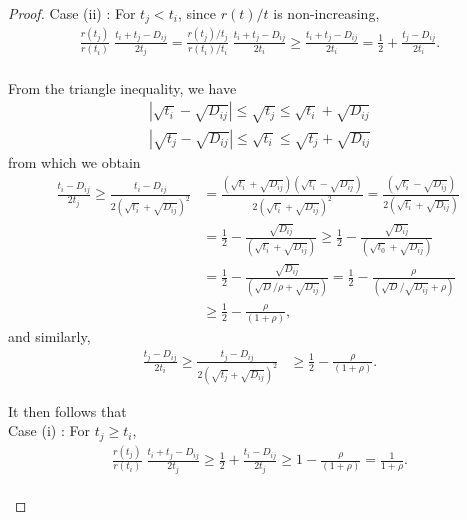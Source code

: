 \documentclass[11pt]{article}
\theoremstyle{definition}
\begin{document}
\begin{proof}
  {Case (ii) \hspace{-1mm}:} For $t_j < t_i$, since $r(t)/t$ is non-increasing,
  \begin{align}
   \nonumber   \frac{r(t_j)}{r(t_i)}\; \frac{t_i + t_j - D_{ij}}{2t_j} =  \frac{r(t_j)/t_j}{r(t_i)/t_i} \; \frac{t_i + t_j - D_{ij}}{2t_i}  \geq \frac{t_i + t_j - D_{ij}}{2t_i} = \frac{1}{2} + \frac{t_j  - D_{ij}}{2t_i}.
  \end{align}
\\
From the triangle inequality, we have 
\begin{align}
    \label{triangle inequalities1}  |\sqrt{t_i} - \sqrt{D_{ij}}| \leq \sqrt{t_j} \leq  \sqrt{t_i} + \sqrt{D_{ij}} \\
    |\sqrt{t_j} - \sqrt{D_{ij}}| \leq \sqrt{t_i} \leq  \sqrt{t_j} + \sqrt{D_{ij}} 
    \label{triangle inequalities2}
\end{align}
from which we obtain
\begin{align*}
    \frac{t_i  - D_{ij}}{2t_j} \geq \frac{t_i  - D_{ij}}{2(\sqrt{t_i} + \sqrt{D_{ij}})^2}  & = \frac{(\sqrt{t_i} + \sqrt{D_{ij}})(\sqrt{t_i} - \sqrt{D_{ij}})}{2(\sqrt{t_i} + \sqrt{D_{ij}})^2}  = \frac{(\sqrt{t_i} - \sqrt{D_{ij}})}{2(\sqrt{t_i} + \sqrt{D_{ij}})}\;\\
    & = \frac{1}{2} - \frac{\sqrt{D_{ij}}}{(\sqrt{t_i} + \sqrt{D_{ij}})} \geq \frac{1}{2} - \frac{\sqrt{D_{ij}}}{(\sqrt{t_0} + \sqrt{D_{ij}})} \\
    & = \frac{1}{2} - \frac{\sqrt{D_{ij}}}{(\sqrt{D}/\rho + \sqrt{D_{ij}})} = \frac{1}{2} - \frac{\rho }{(\sqrt{D}/\sqrt{D_{ij}} + \rho)} \\
    & \geq \frac{1}{2} - \frac{\rho }{(1 + \rho)},
\end{align*}
and similarly,
\begin{align*}
    \frac{t_j  - D_{ij}}{2t_i} \geq \frac{t_j  - D_{ij}}{2(\sqrt{t_j} + \sqrt{D_{ij}})^2}  & \geq \frac{1}{2} - \frac{\rho }{(1 + \rho)}.
\end{align*}

It then follows that\\

{Case (i) \hspace{-1mm}:} For $t_j \geq t_i$, 
  \begin{align}
    \nonumber   \frac{r(t_j)}{r(t_i)}\; \frac{t_i + t_j - D_{ij}}{2t_j} \geq  \frac{1}{2} + \frac{t_i  - D_{ij}}{2t_j} \geq 1 - \frac{\rho }{(1 + \rho)} = \frac{1}{1 + \rho}.
  \end{align}
  \\
  

\end{proof}
\end{document}

